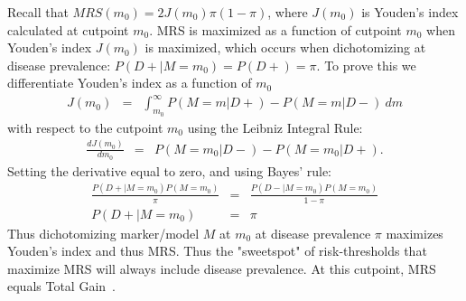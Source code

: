 \documentclass[11pt]{article}
\begin{document}
Recall that $MRS(m_0)=2J(m_0)\pi(1-\pi)$, where $J(m_0)$ is Youden's index calculated at cutpoint $m_0$.  MRS is maximized as a function of cutpoint $m_0$ when Youden's index $J(m_0)$ is maximized, which occurs when dichotomizing at disease prevalence: $P(D+|M=m_0)=P(D+)=\pi$.  To prove this we differentiate Youden's index as a function of $m_0$ 
\begin{eqnarray*}
	J(m_0) &=& \int_{m_0}^\infty P(M=m|D+)-P(M=m|D-)~dm
\end{eqnarray*}
with respect to the cutpoint $m_0$ using the Leibniz Integral Rule:
\begin{eqnarray*}
	\frac{dJ(m_0)}{dm_0} &=& P(M=m_0|D-)-P(M=m_0|D+).
\end{eqnarray*}
Setting the derivative equal to zero, and using Bayes' rule:
\begin{eqnarray*}
	\frac{P(D+|M=m_0)P(M=m_0)}{\pi} &=& \frac{P(D-|M=m_0)P(M=m_0)}{1-\pi}\\
	P(D+|M=m_0) &=& \pi
\end{eqnarray*}
Thus dichotomizing marker/model $M$ at $m_0$ at disease prevalence $\pi$ maximizes Youden's index and thus MRS.  Thus the "sweetspot" of risk-thresholds that maximize MRS will always include disease prevalence.  At this cutpoint, MRS equals Total Gain~\citep{bura2001binary}.
\end{document}
